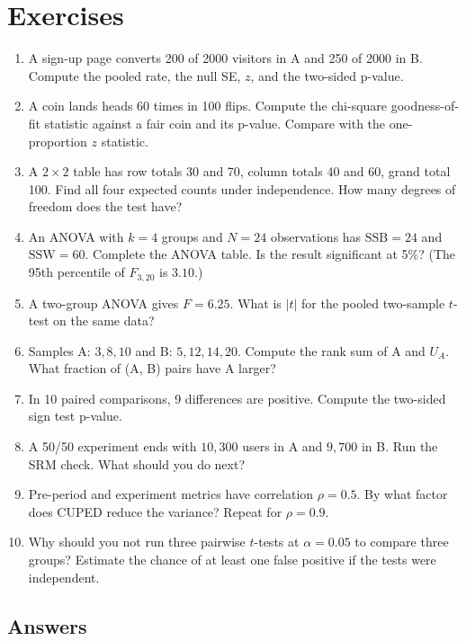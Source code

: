 \section{Exercises}

\begin{enumerate}
  \item A sign-up page converts 200 of 2000 visitors in A and 250 of 2000 in B.
  Compute the pooled rate, the null SE, $z$, and the two-sided p-value.
  \item A coin lands heads 60 times in 100 flips. Compute the chi-square
  goodness-of-fit statistic against a fair coin and its p-value. Compare with
  the one-proportion $z$ statistic.
  \item A $2\times 2$ table has row totals 30 and 70, column totals 40 and 60,
  grand total 100. Find all four expected counts under independence. How many
  degrees of freedom does the test have?
  \item An ANOVA with $k = 4$ groups and $N = 24$ observations has
  $\text{SSB} = 24$ and $\text{SSW} = 60$. Complete the ANOVA table. Is the
  result significant at 5\%? (The 95th percentile of $F_{3,20}$ is $3.10$.)
  \item A two-group ANOVA gives $F = 6.25$. What is $|t|$ for the pooled
  two-sample $t$-test on the same data?
  \item Samples A: $3, 8, 10$ and B: $5, 12, 14, 20$. Compute the rank sum of A
  and $U_A$. What fraction of (A, B) pairs have A larger?
  \item In 10 paired comparisons, 9 differences are positive. Compute the
  two-sided sign test p-value.
  \item A 50/50 experiment ends with $10{,}300$ users in A and $9{,}700$ in B.
  Run the SRM check. What should you do next?
  \item Pre-period and experiment metrics have correlation $\rho = 0.5$. By
  what factor does CUPED reduce the variance? Repeat for $\rho = 0.9$.
  \item Why should you not run three pairwise $t$-tests at $\alpha = 0.05$ to
  compare three groups? Estimate the chance of at least one false positive if
  the tests were independent.
\end{enumerate}

\subsection*{Answers}

